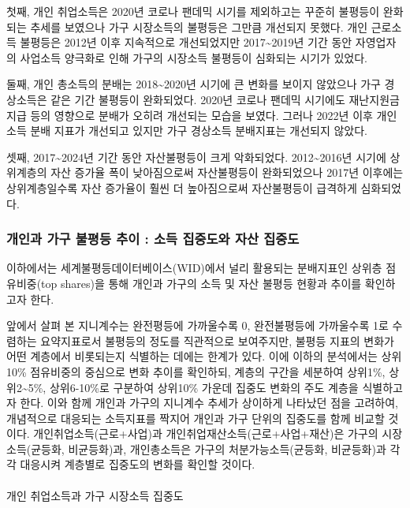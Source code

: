 \documentclass[
  letterpaper,
  DIV=11,
  numbers=noendperiod]{scrartcl}
\makeatletter
\let\oldparagraph\paragraph
\renewcommand{\paragraph}{
    \@ifstar
      \xxxParagraphStar
      \xxxParagraphNoStar
  }
\newcommand{\xxxParagraphStar}[1]{\oldparagraph*{#1}\mbox{}}
\newcommand{\xxxParagraphNoStar}[1]{\oldparagraph{#1}\mbox{}}
\makeatother
\begin{document}
첫째, 개인 취업소득은 2020년 코로나 팬데믹 시기를 제외하고는 꾸준히
불평등이 완화되는 추세를 보였으나 가구 시장소득의 불평등은 그만큼
개선되지 못했다. 개인 근로소득 불평등은 2012년 이후 지속적으로
개선되었지만 2017\textasciitilde2019년 기간 동안 자영업자의 사업소득
양극화로 인해 가구의 시장소득 불평등이 심화되는 시기가 있었다.

둘째, 개인 총소득의 분배는 2018\textasciitilde2020년 시기에 큰 변화를
보이지 않았으나 가구 경상소득은 같은 기간 불평등이 완화되었다. 2020년
코로나 팬데믹 시기에도 재난지원금 지급 등의 영향으로 분배가 오히려
개선되는 모습을 보였다. 그러나 2022년 이후 개인소득 분배 지표가 개선되고
있지만 가구 경상소득 분배지표는 개선되지 않았다.

셋째, 2017\textasciitilde2024년 기간 동안 자산불평등이 크게 악화되었다.
2012\textasciitilde2016년 시기에 상위계층의 자산 증가율 폭이
낮아짐으로써 자산불평등이 완화되었으나 2017년 이후에는 상위계층일수록
자산 증가율이 훨씬 더 높아짐으로써 자산불평등이 급격하게 심화되었다.

\subsubsection{개인과 가구 불평등 추이 : 소득 집중도와 자산
집중도}\label{uxac1cuxc778uxacfc-uxac00uxad6c-uxbd88uxd3c9uxb4f1-uxcd94uxc774-uxc18cuxb4dd-uxc9d1uxc911uxb3c4uxc640-uxc790uxc0b0-uxc9d1uxc911uxb3c4}

이하에서는 세계불평등데이터베이스(WID)에서 널리 활용되는 분배지표인
상위층 점유비중(top shares)을 통해 개인과 가구의 소득 및 자산 불평등
현황과 추이를 확인하고자 한다.

앞에서 살펴 본 지니계수는 완전평등에 가까울수록 0, 완전불평등에
가까울수록 1로 수렴하는 요약지표로서 불평등의 정도를 직관적으로
보여주지만, 불평등 지표의 변화가 어떤 계층에서 비롯되는지 식별하는
데에는 한계가 있다. 이에 이하의 분석에서는 상위 10\% 점유비중의 중심으로
변화 추이를 확인하되, 계층의 구간을 세분하여 상위1\%,
상위2\textasciitilde5\%, 상위6-10\%로 구분하여 상위10\% 가운데 집중도
변화의 주도 계층을 식별하고자 한다. 이와 함께 개인과 가구의 지니계수
추세가 상이하게 나타났던 점을 고려하여, 개념적으로 대응되는 소득지표를
짝지어 개인과 가구 단위의 집중도를 함께 비교할 것이다.
개인취업소득(근로+사업)과 개인취업재산소득(근로+사업+재산)은 가구의
시장소득(균등화, 비균등화)과, 개인총소득은 가구의 처분가능소득(균등화,
비균등화)과 각각 대응시켜 계층별로 집중도의 변화를 확인할 것이다.

\paragraph{개인 취업소득과 가구 시장소득
집중도}\label{uxac1cuxc778-uxcde8uxc5c5uxc18cuxb4dduxacfc-uxac00uxad6c-uxc2dcuxc7a5uxc18cuxb4dd-uxc9d1uxc911uxb3c4}
\end{document}
